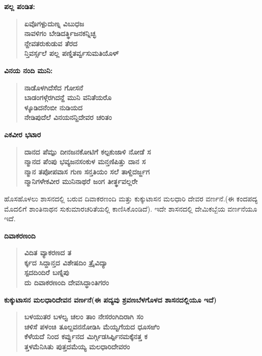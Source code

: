 \noindent
\textbf{ಪಲ್ಲ ಪಂಡಿತ:}

\begin{verse}
\textbf{ಏವೊಗಳ್ಪುದುಣ್ನ ವಿಬುಧಜ \\ ನಾವಳಿಗಂ ಬೇಡಿದರ್ತ್ಥಿಜನಕನ್ನಿಚ್ಛ \\ ನ್ದೇವತರುಕುಡುವ ತೆರದ \\ ನ್ತಿವರ್ಸ್ಸಲೆ ಪಲ್ಲ ಪಣ್ಡಿತರ್ವ್ವಸುಮತಿಯೊಳ್​}
\end{verse}

\noindent
\textbf{ವಿನಯ ನಂದಿ ಮುನಿ:}

\begin{verse}
\textbf{ನಾಡೊಳಗಿದೆಸೆದ ಗೋಸನೆ \\ ಬಾಡಂಗಳ್ಗೆರಗಿದನ್ದೆ ಮುನಿ ವನಿತೆಯರೊ\\ ಳ್ಕೂಡಿದನೆಂಬೀ ನುಡಿಯದ \\ ನೇಡಿಪುದೆಲೆ ವಿನಯನನ್ದಿದೇವರ ಚರಿತಂ}
\end{verse}

\newpage

\noindent
\textbf{ಎಕವೀರ ಭಟಾರ}

\begin{verse}
\textbf{ದಾನದ ಪೆಮ್ಪು ದೀನಜನಕೋಟಿಗೆ ಕಲ್ಪಕುಜಾಳಿ ನೋಡೆ ಸ \\ ನ್ಮಾನದ ಪೆಂಪು ಭವ್ಯಜನಸಂಕುಳ ಮನ್ತಣಿಪಿತ್ತು ದಾನ ಸ \\ ನ್ಮಾನ ತಪೋಪವಾಸ ಗುಣ ಸನ್ತತಿಯಂ ಸಲೆ ತಾಳ್ದಿದರ್ಜ್ಜಗ \\ ನ್ಮಾನಿಗಳೇಕವೀರ ಮುನಿನಾಥರೆ ಜಂಗ ತೀರ್ತ್ಥವಲ್ಲರೇ}
\end{verse}

ಹೊಸಹೊಳಲು ಶಾಸನದಲ್ಲಿ ಬರುವ ದಿವಾಕರಣಂದಿ ಮತ್ತು ಕುಕ್ಕುಟಾಸನ ಮಲಧಾರಿ ದೇವರ ವರ್ಣನೆ.\break (ಈ ಕಂದಪದ್ಯ ಮೊದಲಿಗೆ ಶಾಂತಿನಾಥನ ಸುಕುಮಾರಚರಿತೆಯಲ್ಲಿ ಕಾಣಿಸಿಕೊಂಡಿದೆ). ಇದೇ ಶಾಸನದಲ್ಲಿ ದೇಮಿಕಬ್ಬೆಯ ವರ್ಣನೆಯೂ ಇದೆ.

\noindent
\textbf{ದಿವಾಕರಣಂದಿ}

\begin{verse}
\textbf{ವಿದಿತ ವ್ಯಾಕರಣದ ತ \\ ರ್ಕ್ಕದ ಸಿದ್ದಾನ್ತದ ವಿಶೇಷದಿಂ ತ್ರೈವಿದ್ಯಾ \\ ಸ್ಪದದಿಂದಿರೆ ಬಣ್ನಿಪು \\ ದು ದಿವಾಕರಣಂದಿ ದೇವಸಿದ್ಧಾಂತಿಗರಂ}
\end{verse}

\noindent
\textbf{ಕುಕ್ಕುಟಾಸನ ಮಲಧಾರಿದೇವನ ವರ್ಣನೆ(ಈ ಪದ್ಯವು ಶ್ರವಣಬೆಳಗೊಳದ ಶಾಸನದಲ್ಲಿಯೂ ಇದೆ)}

\begin{verse}
\textbf{ಬಳಯುತರ ಬಳಲ್ವ ಚಲಂ ತಾಂ ನೇಸರಂಗಿದಿರಾಗಿ ಸಂ \\ ಚಳಿಸೆ ಪಳಂಚಿ ತೂಲ್ದವನನೋಡಿಸಿ ಮೆಯ್ವಗೆಯದ ಧೂಸಱಿಂ \\ ಕೆಳೆಯದೆ ನಿಂದ ಕರ್ವ್ವುನದ ಮಿರ್ಗ್ಗಿಡಸಿರ್ಪ್ಪಿನಮಕ್ಕೆನತ್ತ ಕ \\ ತ್ತಳಮೆನಿಸಿತು ಪುತ್ತದಮೆಯ್ಯ ಮಲಧಾರಿದೇವರಂ}
\end{verse}

